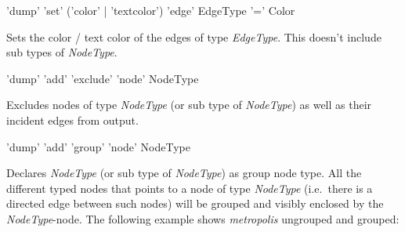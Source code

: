 \begin{rail}
  'dump' 'set' ('color' | 'textcolor') 'edge' EdgeType '=' Color
\end{rail}
Sets the color / text color of the edges of type \emph{EdgeType}. This doesn't include sub types of \emph{NodeType}.

\begin{rail}
  'dump' 'add' 'exclude' 'node' NodeType
\end{rail}
Excludes nodes of type \emph{NodeType} (or sub type of \emph{NodeType}) as well as their incident edges from output.

\begin{rail}
  'dump' 'add' 'group' 'node' NodeType
\end{rail}
Declares \emph{NodeType} (or sub type of \emph{NodeType}) as group node type. All the different typed nodes that points to a node of type \emph{NodeType} (i.e.\ there is a directed edge between such nodes) will be grouped and visibly enclosed by the \emph{NodeType}-node.
The following example shows \emph{metropolis} ungrouped and grouped:
\begin{center}
    \hfill {}
\end{center}

